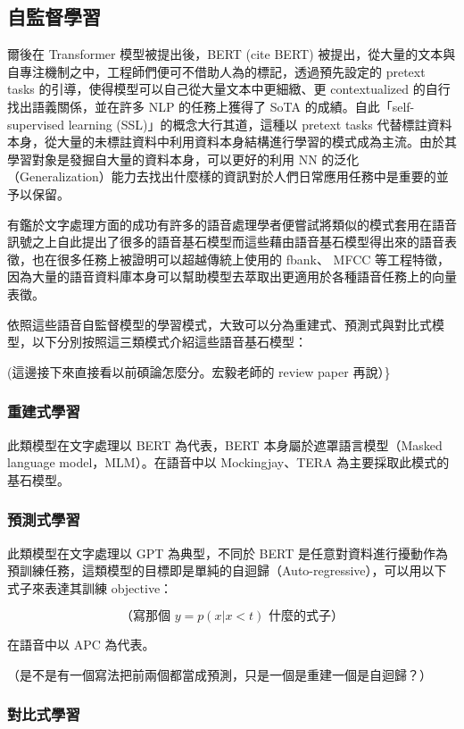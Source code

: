 \subsection{自監督學習}

爾後在 Transformer 模型被提出後，BERT (cite BERT) 被提出，從大量的文本與自專注機制之中，工程師們便可不借助人為的標記，透過預先設定的 pretext tasks 的引導，使得模型可以自己從大量文本中更細緻、更 contextualized 的自行找出語義關係，並在許多 NLP 的任務上獲得了 SoTA 的成績。自此「self-supervised learning (SSL)」的概念大行其道，這種以 pretext tasks 代替標註資料本身，從大量的未標註資料中利用資料本身結構進行學習的模式成為主流。由於其學習對象是發掘自大量的資料本身，可以更好的利用 NN 的泛化（Generalization）能力去找出什麼樣的資訊對於人們日常應用任務中是重要的並予以保留。

有鑑於文字處理方面的成功有許多的語音處理學者便嘗試將類似的模式套用在語音訊號之上自此提出了很多的語音基石模型而這些藉由語音基石模型得出來的語音表徵，也在很多任務上被證明可以超越傳統上使用的 fbank、 MFCC 等工程特徵，因為大量的語音資料庫本身可以幫助模型去萃取出更適用於各種語音任務上的向量表徵。

依照這些語音自監督模型的學習模式，大致可以分為重建式、預測式與對比式模型，以下分別按照這三類模式介紹這些語音基石模型：

(這邊接下來直接看以前碩論怎麼分。宏毅老師的 review paper 再說）\}

\subsubsection{重建式學習}

此類模型在文字處理以 BERT 為代表，BERT 本身屬於遮罩語言模型（Masked language model，MLM）。在語音中以 Mockingjay、TERA 為主要採取此模式的基石模型。

\subsubsection{預測式學習}

此類模型在文字處理以 GPT 為典型，不同於 BERT 是任意對資料進行擾動作為預訓練任務，這類模型的目標即是單純的自迴歸（Auto-regressive），可以用以下式子來表達其訓練 objective：

\[ \mbox{（寫那個 } y = p(x|x<t) \mbox{ 什麼的式子）} \]

在語音中以 APC 為代表。

（是不是有一個寫法把前兩個都當成預測，只是一個是重建一個是自迴歸？）

\subsubsection{對比式學習}

